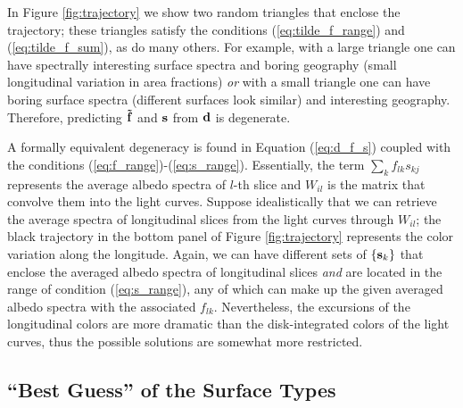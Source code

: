 \documentclass[iop,numberedappendix,apj]{emulateapj}
\def\fast{\tilde f}
\begin{document}

In Figure \ref{fig:trajectory} we show two random triangles that enclose the trajectory; these triangles satisfy the conditions (\ref{eq:tilde_f_range}) and (\ref{eq:tilde_f_sum}), as do many others. 
For example, with a large triangle one can have spectrally interesting surface spectra and boring geography (small longitudinal variation in area fractions) {\it or} with a small triangle one can have boring surface spectra (different surfaces look similar) and interesting geography. 
Therefore, predicting ${\bf \fast }$ and ${\bf s}$ from ${\bf d}$ is degenerate.  

A formally equivalent degeneracy is found in Equation (\ref{eq:d_f_s}) coupled with the conditions (\ref{eq:f_range})-(\ref{eq:s_range}). 
Essentially, the term $\sum _k f_{lk} s_{kj}$ represents the average albedo spectra of $l$-th slice and $W_{il}$ is the matrix that convolve them into the light curves. 
Suppose idealistically that we can retrieve the average spectra of longitudinal slices from the light curves through $W_{il}$; the black trajectory in the bottom panel of Figure \ref{fig:trajectory} represents the color variation along the longitude.  
Again, we can have different sets of $\{ {\bf s}_k \}$ that enclose the averaged albedo spectra of longitudinal slices {\it and} are located in the range of condition (\ref{eq:s_range}), any of which can make up the given averaged albedo spectra with the associated $f_{lk}$. 
Nevertheless, the excursions of the longitudinal colors are more dramatic than the disk-integrated colors of the light curves, thus the possible solutions are somewhat more restricted. 


\subsection{``Best Guess'' of the Surface Types}
\label{ss:guess}
\end{document}
